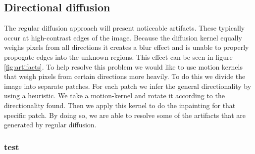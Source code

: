 \subsection{Directional diffusion}

The regular diffusion approach will present noticeable artifacts. These typically occur at high-contrast edges of the image. Because the diffusion kernel equally weighs pixels from all directions it creates a blur effect and is unable to properly propogate edges into the unknown regions. This effect can be seen in figure \ref{fig:artifacts}. To help resolve this problem we would like to use motion kernels that weigh pixels from certain directions more heavily. To do this we divide the image into separate patches. For each patch we infer the general directionality by using a heuristic. We take a motion-kernel and rotate it according to the directionality found. Then we apply this kernel to do the inpainting for that specific patch. By doing so, we are able to resolve some of the artifacts that are generated by regular diffusion.

\subsubsection{test}

